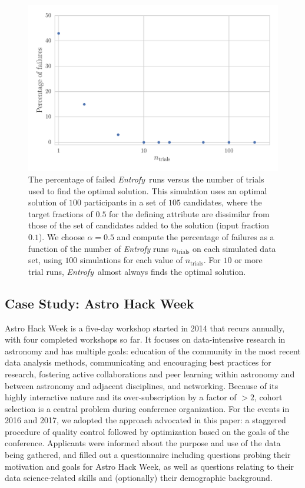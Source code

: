 \documentclass[10pt,letterpaper]{article}
\newcommand{\project}[1]{\textsl{#1}}
\newcommand{\entrofy}{\project{Entrofy}}
\begin{document}
\begin{figure}[htbp]
\begin{center}
\includegraphics[width=5in]{f2.pdf}
\caption{The percentage of failed \entrofy\ runs versus the number of 
trials used to find the optimal solution. This simulation uses an optimal solution of $100$ participants in a set of $105$ candidates, where the target fractions of $0.5$ for the defining attribute are dissimilar from those of the set of candidates added to the solution (input fraction $0.1$). We choose $\alpha = 0.5$ and compute the percentage of failures as a function of the number of \textit{Entrofy} runs $n_\mathrm{trials}$ on each simulated data set, using $100$ simulations for each value of $n_\mathrm{trials}$.
For $10$ or more trial runs, \entrofy\ almost always finds the optimal solution.}
\label{fig:experiments2}
\end{center}
\end{figure}


\subsection*{Case Study: Astro Hack Week}
\label{sec:casestudy}

Astro Hack Week is a five-day workshop started in 2014 that recurs annually, with four completed workshops so far. It focuses on data-intensive research in astronomy and has multiple goals: education of the community in the most recent data analysis methods, communicating and encouraging best practices for research, fostering active collaborations and peer learning within astronomy and between astronomy and adjacent disciplines, and networking. Because of its highly interactive nature and its over-subscription by a factor of $>2$, cohort selection is a central problem during conference organization. For the events in 2016 and 2017, we adopted the approach advocated in this paper: a staggered procedure of quality control followed by optimization based on the goals of the conference. Applicants were informed about the purpose and use of the data being gathered, and filled out a questionnaire including questions probing their motivation and goals for Astro Hack Week, as well as questions relating to their data science-related skills and (optionally) their demographic background.
\end{document}

